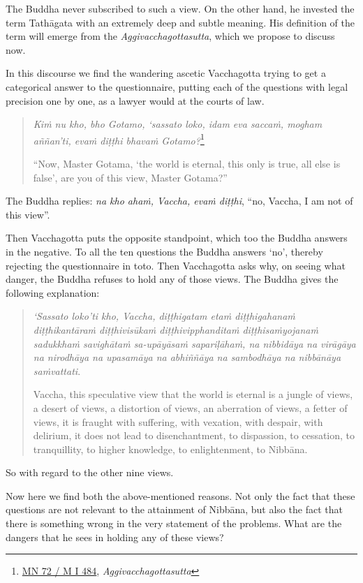 The Buddha never subscribed to such a view. On the other hand, he invested the term Tathāgata with an extremely deep and subtle meaning. His definition of the term will emerge from the \emph{Aggivacchagottasutta}, which we propose to discuss now.

In this discourse we find the wandering ascetic Vacchagotta trying to get a categorical answer to the questionnaire, putting each of the questions with legal precision one by one, as a lawyer would at the courts of law.

\begin{quote}
\emph{Kiṁ nu kho, bho Gotamo, `sassato loko, idam eva saccaṁ, mogham aññan'ti, evaṁ diṭṭhi bhavaṁ Gotamo?}\footnote{\href{https://suttacentral.net/mn72/pli/ms}{MN 72 / M I 484}, \emph{Aggivacchagottasutta}}

``Now, Master Gotama, `the world is eternal, this only is true, all else is false', are you of this view, Master Gotama?''
\end{quote}

The Buddha replies: \emph{na kho ahaṁ, Vaccha, evaṁ diṭṭhi}, ``no, Vaccha, I am not of this view''.

Then Vacchagotta puts the opposite standpoint, which too the Buddha answers in the negative. To all the ten questions the Buddha answers `no', thereby rejecting the questionnaire in toto. Then Vacchagotta asks why, on seeing what danger, the Buddha refuses to hold any of those views. The Buddha gives the following explanation:

\begin{quote}
\emph{`Sassato loko'ti kho, Vaccha, diṭṭhigatam etaṁ diṭṭhigahanaṁ diṭṭhikantāraṁ diṭṭhivisūkaṁ diṭṭhivipphanditaṁ diṭṭhisaṁyojanaṁ sadukkhaṁ savighātaṁ sa-upāyāsaṁ sapariḷāhaṁ, na nibbidāya na virāgāya na nirodhāya na upasamāya na abhiññāya na sambodhāya na nibbānāya saṁvattati}.

Vaccha, this speculative view that the world is eternal is a jungle of views, a desert of views, a distortion of views, an aberration of views, a fetter of views, it is fraught with suffering, with vexation, with despair, with delirium, it does not lead to disenchantment, to dispassion, to cessation, to tranquillity, to higher knowledge, to enlightenment, to Nibbāna.
\end{quote}

So with regard to the other nine views.

Now here we find both the above-mentioned reasons. Not only the fact that these questions are not relevant to the attainment of Nibbāna, but also the fact that there is something wrong in the very statement of the problems. What are the dangers that he sees in holding any of these views?

